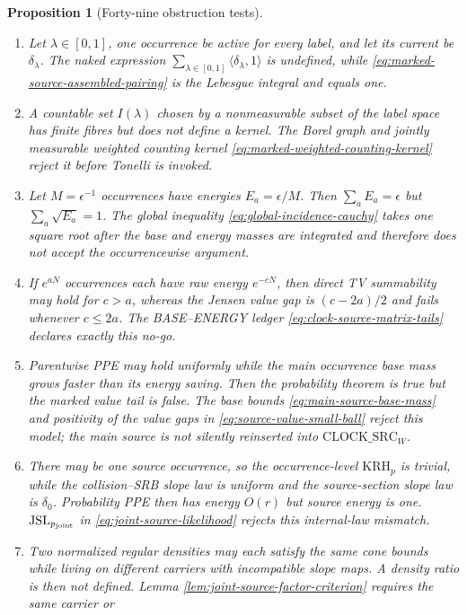 \documentclass[11pt]{article}
\newtheorem{proposition}[theorem]{Proposition}
\begin{document}
\begin{proposition}[Forty-nine obstruction tests]
\begin{enumerate}[label=\textup{(T\arabic*)}]
\item Let $\lambda\in[0,1]$, one occurrence be active for every label, and
      let its current be $\delta_\lambda$.  The naked expression
      $\sum_{\lambda\in[0,1]}\langle\delta_\lambda,1\rangle$ is undefined,
      while \eqref{eq:marked-source-assembled-pairing} is the Lebesgue
      integral and equals one.
\item A countable set $I(\lambda)$ chosen by a nonmeasurable subset of the
      label space has finite fibres but does not define a kernel.  The Borel
      graph and jointly measurable weighted counting kernel
      \eqref{eq:marked-weighted-counting-kernel} reject it before Tonelli is
      invoked.
\item Let $M=\epsilon^{-1}$ occurrences have energies
      $E_a=\epsilon/M$.  Then $\sum_aE_a=\epsilon$ but
      $\sum_a\sqrt{E_a}=1$.  The global inequality
      \eqref{eq:global-incidence-cauchy} takes one square root after the base
      and energy masses are integrated and therefore does not accept the
      occurrencewise argument.
\item If $e^{aN}$ occurrences each have raw energy $e^{-cN}$, then direct TV
      summability may hold for $c>a$, whereas the Jensen value gap is
      $(c-2a)/2$ and fails whenever $c\le2a$.  The BASE--ENERGY ledger
      \eqref{eq:clock-source-matrix-tails} declares exactly this no-go.
\item Parentwise PPE may hold uniformly while the main occurrence base mass
      grows faster than its energy saving.  Then the probability theorem is
      true but the marked value tail is false.  The base bounds
      \eqref{eq:main-source-base-mass} and positivity of the value gaps in
      \eqref{eq:source-value-small-ball} reject this model; the main source
      is not silently reinserted into $\mathrm{CLOCK\_SRC}_{W}$.
\item There may be one source occurrence, so the occurrence-level
      $\mathrm{KRH}_p$ is trivial, while the collision--SRB slope law is
      uniform and the source-section slope law is $\delta_0$.  Probability
      PPE then has energy $O(r)$ but source energy is one.
      $\mathrm{JSL}_{p_{\rm joint}}$ in
      \eqref{eq:joint-source-likelihood} rejects this internal-law mismatch.
\item Two normalized regular densities may each satisfy the same cone bounds
      while living on different carriers with incompatible slope maps.  A
      density ratio is then not defined.  Lemma
      \ref{lem:joint-source-factor-criterion} requires the same carrier or

\end{enumerate}
\end{proposition}
\end{document}
